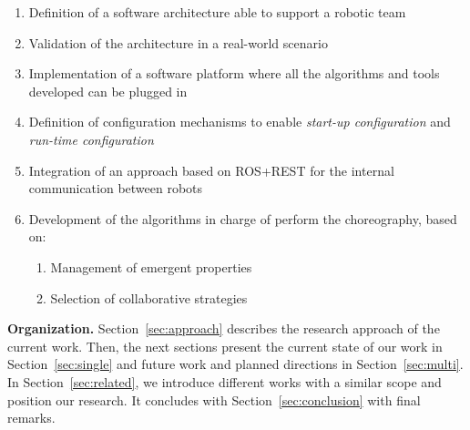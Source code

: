 \begin{enumerate}
\item Definition of a software architecture able to support a robotic team
\item Validation of the architecture in a real-world scenario
\item Implementation of a software platform where all the algorithms and tools developed can be plugged in 
\item Definition of configuration mechanisms to enable \emph{start-up configuration} and \emph{run-time configuration}
\item Integration of an approach based on ROS+REST for the internal communication between robots
\item Development of the algorithms in charge of perform the choreography, based on:
\begin{enumerate}
\item Management of emergent properties
\item Selection of collaborative strategies
\end{enumerate}
\end{enumerate}

\textbf{Organization.} 
Section~\ref{sec:approach} describes the research approach of the current work.
Then, the next sections present the current state of our work in Section~\ref{sec:single} and future work and planned directions in Section~\ref{sec:multi}.
In Section~\ref{sec:related}, we introduce different works with a similar scope and position our research.
It concludes with Section~\ref{sec:conclusion} with final remarks.